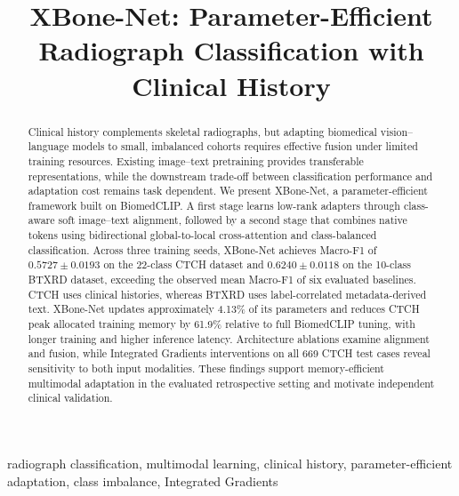 \documentclass[conference,a4paper]{IEEEtran}
\begin{document}
\title{XBone-Net: Parameter-Efficient Radiograph Classification with Clinical History}
\author{
}
\maketitle

\begin{abstract}
Clinical history complements skeletal radiographs, but adapting biomedical vision--language models to small, imbalanced cohorts requires effective fusion under limited training resources. Existing image--text pretraining provides transferable representations, while the downstream trade-off between classification performance and adaptation cost remains task dependent. We present XBone-Net, a parameter-efficient framework built on BiomedCLIP. A first stage learns low-rank adapters through class-aware soft image--text alignment, followed by a second stage that combines native tokens using bidirectional global-to-local cross-attention and class-balanced classification. Across three training seeds, XBone-Net achieves Macro-F1 of $0.5727\pm0.0193$ on the 22-class CTCH dataset and $0.6240\pm0.0118$ on the 10-class BTXRD dataset, exceeding the observed mean Macro-F1 of six evaluated baselines. CTCH uses clinical histories, whereas BTXRD uses label-correlated metadata-derived text. XBone-Net updates approximately 4.13\% of its parameters and reduces CTCH peak allocated training memory by 61.9\% relative to full BiomedCLIP tuning, with longer training and higher inference latency. Architecture ablations examine alignment and fusion, while Integrated Gradients interventions on all 669 CTCH test cases reveal sensitivity to both input modalities. These findings support memory-efficient multimodal adaptation in the evaluated retrospective setting and motivate independent clinical validation.
\end{abstract}
\begin{IEEEkeywords}
radiograph classification, multimodal learning, clinical history, parameter-efficient adaptation, class imbalance, Integrated Gradients
\end{IEEEkeywords}
\end{document}
